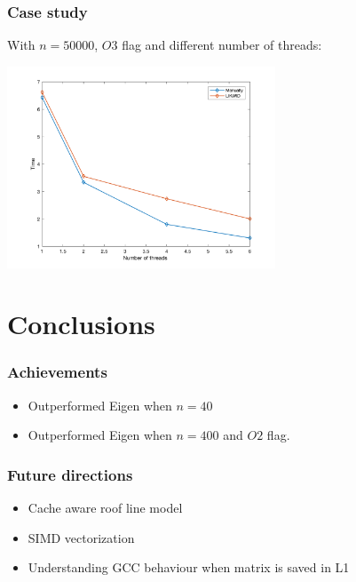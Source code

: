\documentclass{beamer}
\begin{document}
\begin{frame}
\frametitle{Case study}
With $n = 50000$, $O3$ flag and different number of threads: 
\begin{center}
\includegraphics[width=8cm, height=6cm]{graficotimes}
\end{center}
\end{frame}

\section{Conclusions}

\begin{frame}
\frametitle{Achievements}
\begin{itemize}
 \item Outperformed Eigen when $n = 40$
 \item Outperformed Eigen when $n = 400$ and $O2$ flag.
\end{itemize}
 \end{frame}
 
\begin{frame}
\frametitle{Future directions}

\begin{itemize}
 \item Cache aware roof line model
 \item SIMD vectorization
 \item Understanding GCC behaviour when matrix is saved in L1
\end{itemize}
\end{frame}
\end{document}
